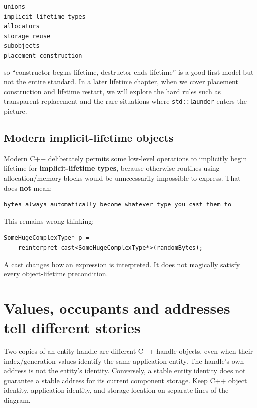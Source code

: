 \begin{verbatim}
unions
implicit-lifetime types
allocators
storage reuse
subobjects
placement construction
\end{verbatim}

so ``constructor begins lifetime, destructor ends lifetime'' is a good first model but not the entire standard. In a later lifetime chapter, when we cover placement construction and lifetime restart, we will explore the hard rules such as transparent replacement and the rare situations where \texttt{std::launder} enters the picture.

\subsection{Modern implicit-lifetime objects}\label{05-engine-i-ch002-modern-implicit-lifetime-objects}

\hypertarget{05-engine-i-ch002-modern-implicit-lifetime-objects}{}

Modern C++ deliberately permits some low-level operations to implicitly begin lifetime for \textbf{implicit-lifetime types}, because otherwise routines using allocation/memory blocks would be unnecessarily impossible to express. That does \textbf{not} mean:

\begin{verbatim}
bytes always automatically become whatever type you cast them to
\end{verbatim}

This remains wrong thinking:

\begin{verbatim}
SomeHugeComplexType* p =
    reinterpret_cast<SomeHugeComplexType*>(randomBytes);
\end{verbatim}

A cast changes how an expression is interpreted. It does not magically satisfy every object-lifetime precondition.

\section{Values, occupants and addresses tell different stories}\label{05-engine-i-ch002-values-occupants-and-addresses-tell-different-stories}

\hypertarget{05-engine-i-ch002-values-occupants-and-addresses-tell-different-stories}{}

Two copies of an entity handle are different C++ handle objects, even when their index/generation values identify the same application entity. The handle's own address is not the entity's identity. Conversely, a stable entity identity does not guarantee a stable address for its current component storage. Keep C++ object identity, application identity, and storage location on separate lines of the diagram.

